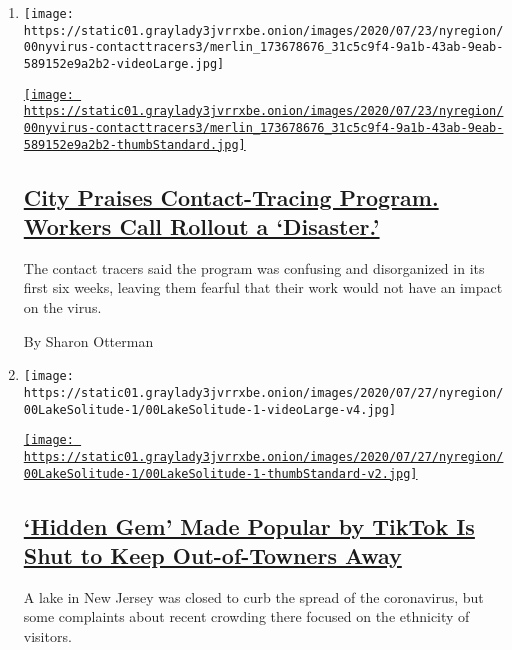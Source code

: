 \begin{enumerate}
\def\labelenumi{\arabic{enumi}.}
\item
  \texttt{[image: https://static01.graylady3jvrrxbe.onion/images/2020/07/23/nyregion/00nyvirus-contacttracers3/merlin\_173678676\_31c5c9f4-9a1b-43ab-9eab-589152e9a2b2-videoLarge.jpg]}

  \href{/2020/07/29/nyregion/new-york-contact-tracing.html}{\texttt{[image: https://static01.graylady3jvrrxbe.onion/images/2020/07/23/nyregion/00nyvirus-contacttracers3/merlin\_173678676\_31c5c9f4-9a1b-43ab-9eab-589152e9a2b2-thumbStandard.jpg]}}

  \hypertarget{city-praises-contact-tracing-program-workers-call-rollout-a-disaster}{%
  \subsection{\texorpdfstring{\href{/2020/07/29/nyregion/new-york-contact-tracing.html}{City
  Praises Contact-Tracing Program. Workers Call Rollout a
  `Disaster.'}}{City Praises Contact-Tracing Program. Workers Call Rollout a `Disaster.'}}\label{city-praises-contact-tracing-program-workers-call-rollout-a-disaster}}

  The contact tracers said the program was confusing and disorganized in
  its first six weeks, leaving them fearful that their work would not
  have an impact on the virus.

  By Sharon Otterman
\item
  \texttt{[image: https://static01.graylady3jvrrxbe.onion/images/2020/07/27/nyregion/00LakeSolitude-1/00LakeSolitude-1-videoLarge-v4.jpg]}

  \href{/2020/07/29/nyregion/lake-solitude-closed-racism.html}{\texttt{[image: https://static01.graylady3jvrrxbe.onion/images/2020/07/27/nyregion/00LakeSolitude-1/00LakeSolitude-1-thumbStandard-v2.jpg]}}

  \hypertarget{hidden-gem-made-popular-by-tiktok-is-shut-to-keep-out-of-towners-away}{%
  \subsection{\texorpdfstring{\href{/2020/07/29/nyregion/lake-solitude-closed-racism.html}{`Hidden
  Gem' Made Popular by TikTok Is Shut to Keep Out-of-Towners
  Away}}{`Hidden Gem' Made Popular by TikTok Is Shut to Keep Out-of-Towners Away}}\label{hidden-gem-made-popular-by-tiktok-is-shut-to-keep-out-of-towners-away}}

  A lake in New Jersey was closed to curb the spread of the coronavirus,
  but some complaints about recent crowding there focused on the
  ethnicity of visitors.


\end{enumerate}
